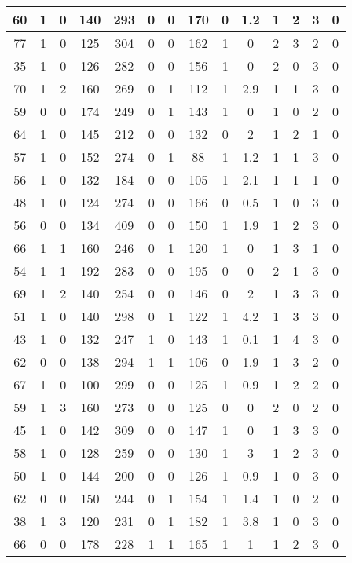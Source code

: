 \documentclass{article}
\begin{document}
\begin{longtable}{|c|c|c|c|c|c|c|c|c|c|c|c|c|c|}
\hline
60 & 1 & 0 & 140 & 293 & 0 & 0 & 170 & 0 & 1.2 & 1 & 2 & 3 & 0\\
\hline
77 & 1 & 0 & 125 & 304 & 0 & 0 & 162 & 1 & 0 & 2 & 3 & 2 & 0\\
\hline
35 & 1 & 0 & 126 & 282 & 0 & 0 & 156 & 1 & 0 & 2 & 0 & 3 & 0\\
\hline
70 & 1 & 2 & 160 & 269 & 0 & 1 & 112 & 1 & 2.9 & 1 & 1 & 3 & 0\\
\hline
59 & 0 & 0 & 174 & 249 & 0 & 1 & 143 & 1 & 0 & 1 & 0 & 2 & 0\\
\hline
64 & 1 & 0 & 145 & 212 & 0 & 0 & 132 & 0 & 2 & 1 & 2 & 1 & 0\\
\hline
57 & 1 & 0 & 152 & 274 & 0 & 1 & 88 & 1 & 1.2 & 1 & 1 & 3 & 0\\
\hline
56 & 1 & 0 & 132 & 184 & 0 & 0 & 105 & 1 & 2.1 & 1 & 1 & 1 & 0\\
\hline
48 & 1 & 0 & 124 & 274 & 0 & 0 & 166 & 0 & 0.5 & 1 & 0 & 3 & 0\\
\hline
56 & 0 & 0 & 134 & 409 & 0 & 0 & 150 & 1 & 1.9 & 1 & 2 & 3 & 0\\
\hline
66 & 1 & 1 & 160 & 246 & 0 & 1 & 120 & 1 & 0 & 1 & 3 & 1 & 0\\
\hline
54 & 1 & 1 & 192 & 283 & 0 & 0 & 195 & 0 & 0 & 2 & 1 & 3 & 0\\
\hline
69 & 1 & 2 & 140 & 254 & 0 & 0 & 146 & 0 & 2 & 1 & 3 & 3 & 0\\
\hline
51 & 1 & 0 & 140 & 298 & 0 & 1 & 122 & 1 & 4.2 & 1 & 3 & 3 & 0\\
\hline
43 & 1 & 0 & 132 & 247 & 1 & 0 & 143 & 1 & 0.1 & 1 & 4 & 3 & 0\\
\hline
62 & 0 & 0 & 138 & 294 & 1 & 1 & 106 & 0 & 1.9 & 1 & 3 & 2 & 0\\
\hline
67 & 1 & 0 & 100 & 299 & 0 & 0 & 125 & 1 & 0.9 & 1 & 2 & 2 & 0\\
\hline
59 & 1 & 3 & 160 & 273 & 0 & 0 & 125 & 0 & 0 & 2 & 0 & 2 & 0\\
\hline
45 & 1 & 0 & 142 & 309 & 0 & 0 & 147 & 1 & 0 & 1 & 3 & 3 & 0\\
\hline
58 & 1 & 0 & 128 & 259 & 0 & 0 & 130 & 1 & 3 & 1 & 2 & 3 & 0\\
\hline
50 & 1 & 0 & 144 & 200 & 0 & 0 & 126 & 1 & 0.9 & 1 & 0 & 3 & 0\\
\hline
62 & 0 & 0 & 150 & 244 & 0 & 1 & 154 & 1 & 1.4 & 1 & 0 & 2 & 0\\
\hline
38 & 1 & 3 & 120 & 231 & 0 & 1 & 182 & 1 & 3.8 & 1 & 0 & 3 & 0\\
\hline
66 & 0 & 0 & 178 & 228 & 1 & 1 & 165 & 1 & 1 & 1 & 2 & 3 & 0\\

\end{longtable}
\end{document}
